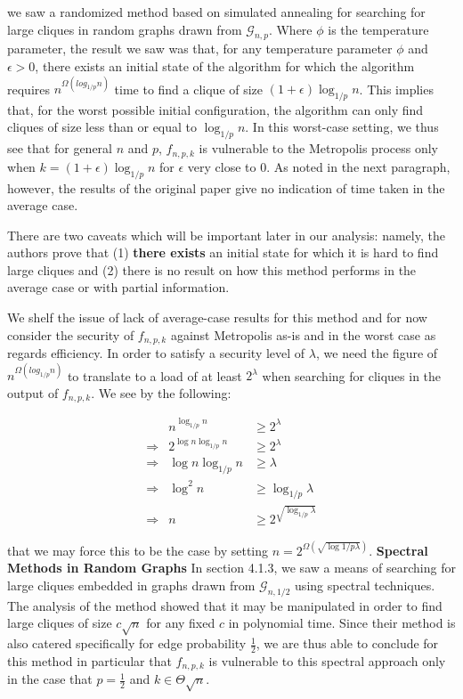 \documentclass{article}
\theoremstyle{definition}
\begin{document}
we saw a randomized method based on simulated annealing for searching for 
large cliques in random graphs drawn from $\mathcal{G}_{n,p}$.  Where $\phi$ 
is the temperature parameter, the result we saw was that, for any temperature 
parameter $\phi$ and $\epsilon > 0$, there exists an initial state of the algorithm for which 
the algorithm requires $n^{\Omega(log_{1/p}{n})}$ time to find a clique of size
$(1+\epsilon) \log_{1/p}{n}$.  This implies that, for the worst possible initial 
configuration, the algorithm can only find cliques of size less than or equal to 
$\log_{1/p}{n}$.  In this worst-case setting, we thus see that for general 
$n$ and $p$, $f_{n,p,k}$ is vulnerable to the Metropolis process only when 
$k=(1+\epsilon)\log_{1/p}{n}$ for $\epsilon$ very close to 0.  As noted in the next 
paragraph, however, the results of the original paper give no indication of time 
taken in the average case.

There are two caveats which will be important later in our analysis: namely, the authors prove that 
(1) \textbf{there exists} an initial state for which it is hard to find large cliques
and (2) there is no result on how this method performs in the average case or 
with partial information.

We shelf the issue of lack of average-case results for this method and for now 
consider the security of $f_{n,p,k}$ against Metropolis as-is and in the worst case as 
regards efficiency.  In order to satisfy a security level of $\lambda$, we need the figure of 
$n^{\Omega(log_{1/p}{n})}$ to translate to a load of at least $2^\lambda$ when searching for 
cliques in the output of $f_{n,p,k}$.  We see by the following:

\begin{align*}
&n^{\log_{1/p}{n}} &\geq 2^{\lambda} \\
\Rightarrow& 2^{\log{n}\log_{1/p}{n}} &\geq 2^{\lambda} \\
\Rightarrow& \log{n}\log_{1/p}{n} &\geq \lambda \\
\Rightarrow& \log^2{n} &\geq \log_{1/p}\lambda \\
\Rightarrow& n &\geq 2^{\sqrt{\log_{1/p}\lambda}}
\end{align*}  

\noindent that we may force this to be the case by setting $n = 2^{\Omega(\sqrt{\log{1/p}\lambda})}$.
\newline\newline
\noindent \textbf{Spectral Methods in Random Graphs } In section 4.1.3,
we saw a means of searching for large cliques embedded in graphs 
drawn from $\mathcal{G}_{n,1/2}$ using spectral techniques.  
The analysis of the method showed that 
it may be manipulated in order to find large cliques of size 
$c\sqrt{n}$ for any fixed $c$ in polynomial time.  Since their method is also
catered specifically for edge probability $\frac{1}{2}$, we are thus able to conclude 
for this method in particular that $f_{n,p,k}$ is vulnerable to this spectral 
approach only in the case that $p=\frac{1}{2}$ and $k \in \Theta{\sqrt{n}}$.
\end{document}
